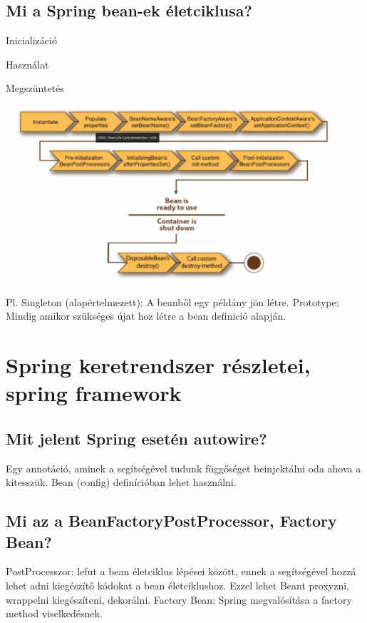 \documentclass[a4paper,14pt]{extarticle}
\begin{document}
		\subsection{Mi a Spring bean-ek életciklusa?}
		\begin{compactitem}
			\item Inicializáció
			\item Használat
			\item Megszüntetés
		\end{compactitem}
		\begin{center}
			\includegraphics[width=13cm]{beanlifecycle}
		\end{center}
		Pl.
		\newline Singleton (alapértelmezett): A beanből egy példány jön létre.
		\newline Prototype: Mindig amikor szükséges újat hoz létre a bean definició alapján.
	
	\section{Spring keretrendszer részletei, spring framework}
		\subsection{Mit jelent Spring esetén autowire?}
		Egy annotáció, aminek a segítségével tudunk függőséget beinjektálni oda ahova a kitesszük. Bean (config) definícióban lehet használni.
		\subsection{Mi az a BeanFactoryPostProcessor, Factory Bean?}
		PostProcesszor: lefut a bean életciklus lépései között, ennek a segítségével hozzá lehet adni kiegészítő kódokat a bean életciklushoz. Ezzel lehet Beant proxyzni, wrappelni kiegészíteni, dekorálni. 
		Factory Bean: Spring megvalósítása  a factory method viselkedésnek.
\end{document}
